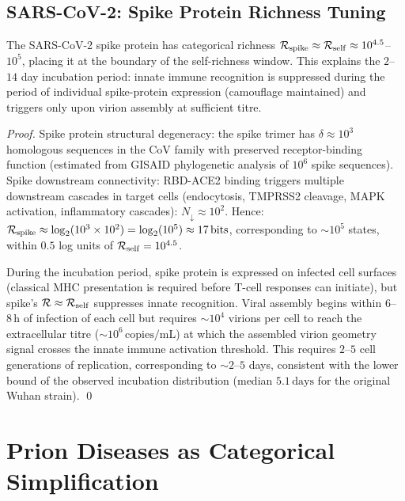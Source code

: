 \subsection{SARS-CoV-2: Spike Protein Richness Tuning}

\begin{proposition}
\label{prop:sars_incubation}
The SARS-CoV-2 spike protein has categorical richness
$\mathcal{R}_{\mathrm{spike}} \approx \mathcal{R}_{\mathrm{self}} \approx 10^{4.5}$--$10^5$,
placing it at the boundary of the self-richness window. This explains the
$2$--$14$ day incubation period: innate immune recognition is suppressed during
the period of individual spike-protein expression (camouflage maintained)
and triggers only upon virion assembly at sufficient titre.
\end{proposition}

\begin{proof}
Spike protein structural degeneracy: the spike trimer has $\delta \approx 10^3$
homologous sequences in the CoV family with preserved receptor-binding function
(estimated from GISAID phylogenetic analysis of $10^6$ spike sequences).
Spike downstream connectivity: RBD-ACE2 binding triggers multiple downstream
cascades in target cells (endocytosis, TMPRSS2 cleavage, MAPK activation,
inflammatory cascades): $N_{\downarrow} \approx 10^2$. Hence:
$\mathcal{R}_{\mathrm{spike}} \approx \log_2(10^3 \times 10^2) = \log_2(10^5) \approx 17\,\mathrm{bits}$,
corresponding to $\sim 10^{5}$ states, within $0.5$ log units of
$\mathcal{R}_{\mathrm{self}} = 10^{4.5}$.

During the incubation period, spike protein is expressed on infected cell
surfaces (classical MHC presentation is required before T-cell responses can
initiate), but spike's $\mathcal{R} \approx \mathcal{R}_{\mathrm{self}}$ suppresses
innate recognition. Viral assembly begins within $6$--$8\,\mathrm{h}$ of
infection of each cell but requires $\sim 10^4$ virions per cell to reach
the extracellular titre ($\sim 10^6\,\mathrm{copies/mL}$) at which the
assembled virion geometry signal crosses the innate immune activation threshold.
This requires $2$--$5$ cell generations of replication, corresponding to
$\sim 2$--$5$ days, consistent with the lower bound of the observed incubation
distribution (median $5.1\,\mathrm{days}$ for the original Wuhan strain). \qed
\end{proof}

\section{Prion Diseases as Categorical Simplification}
\label{sec:prions}

